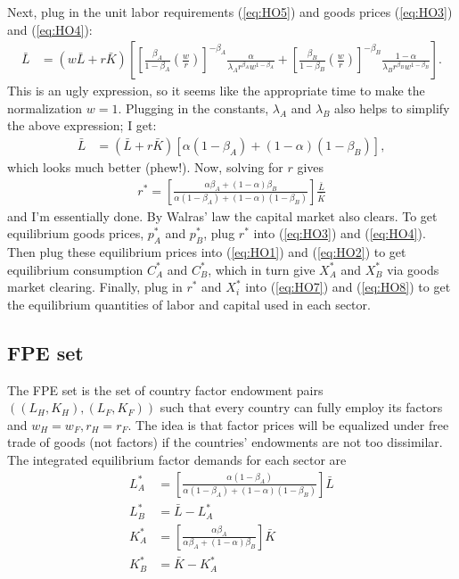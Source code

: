 \documentclass[12pt]{article}
\begin{document}
Next, plug in the unit labor requirements (\ref{eq:HO5}) and goods prices (\ref{eq:HO3}) and (\ref{eq:HO4}):
\begin{align*}
 \bar L&= (w\bar L + r\bar K)\left[\left[ \frac{\beta_A}{1-\beta_A}\left(\frac{w}{r}\right)\right]^{-\beta_A} \frac{\alpha}{\lambda_A r^{\beta_A}w^{1-\beta_A} } + \left[ \frac{\beta_B}{1-\beta_B}\left(\frac{w}{r}\right)\right]^{-\beta_B}  \frac{1-\alpha}{\lambda_B r^{\beta_B}w^{1-\beta_B} }\right].
\end{align*}
This is an ugly expression, so it seems like the appropriate time to make the normalization $w = 1$. Plugging in the constants, $\lambda_A$ and $\lambda_B$ also helps to simplify the above expression; I get:
\begin{align*}
 \bar L&= (\bar L + r\bar K)\left[\alpha(1-\beta_A) + (1-\alpha)(1-\beta_B)\right],
\end{align*}
which looks much better (phew!). Now, solving for $r$ gives
\begin{align}
r^* = \left[\frac{\alpha\beta_A + (1-\alpha)\beta_B}{\alpha(1-\beta_A) + (1-\alpha)(1-\beta_B)}\right] \frac{\bar L}{\bar K} \label{eq:12}
\end{align}
and I'm essentially done. By Walras' law the capital market also clears. To get equilibrium goods prices, $p^*_A$ and $p^*_B$, plug $r^*$ into (\ref{eq:HO3}) and (\ref{eq:HO4}). Then plug these equilibrium prices into (\ref{eq:HO1}) and (\ref{eq:HO2}) to get equilibrium consumption $C_A^*$ and $C_B^*$, which in turn give $X_A^*$ and $X_B^*$ via goods market clearing. Finally, plug in $r^*$ and $X_i^*$ into (\ref{eq:HO7}) and (\ref{eq:HO8}) to get the equilibrium quantities of labor and capital used in each sector.

\subsection{FPE set}
The FPE set is the set of country factor endowment pairs $((L_H,K_H),(L_F,K_F))$ such that every country can fully employ its factors and $w_H=w_F, r_H=r_F$. The idea is that factor prices will be equalized under free trade of goods (not factors) if the countries' endowments are not too dissimilar.\\

The integrated equilibrium factor demands for each sector are
\begin{align*}
L^*_A &= \left[\frac{\alpha(1-\beta_A) }{\alpha(1-\beta_A) + (1-\alpha)(1-\beta_B)}\right] \bar L\\
L^*_B &= \bar L - L^*_A\\
K^*_A &=  \left[\frac{\alpha\beta_A}{\alpha\beta_A + (1-\alpha)\beta_B}\right] \bar K\\
K^*_B &= \bar K - K^*_A
\end{align*}
\end{document}

